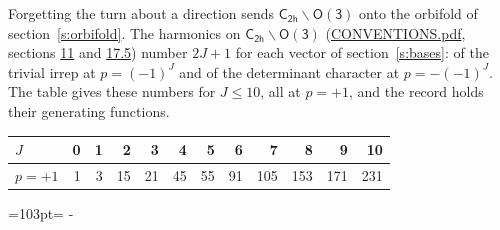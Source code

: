 \documentclass[10pt,a4paper]{article}
\newcommand{\needspace}[1]{\par\penalty-100\begingroup\dimen0=#1\relax\dimen2=\pagegoal
  \advance\dimen2-\pagetotal\ifdim\dimen0>\dimen2\relax\ifdim\dimen2>0pt\vfil\break\fi\fi
  \endgroup}
\numberwithin{equation}{section}
\newcommand{\grp}[1]{\mathsf{#1}}
\begin{document}
Forgetting the turn about a direction sends $\grp{C_{2h}}\backslash\grp{O(3)}$ onto the orbifold of section~\ref{s:orbifold}.
The harmonics on $\grp{C_{2h}}\backslash\grp{O(3)}$ (\href{../../CONVENTIONS.pdf}{CONVENTIONS.pdf}, sections \href{../../CONVENTIONS.pdf\#conv.11}{11} and \href{../../CONVENTIONS.pdf\#conv.17.5}{17.5}) number $2J + 1$ for each vector of section~\ref{s:bases}: of the trivial irrep at $p = (-1)^J$ and of the determinant character at $p = -(-1)^J$. The table gives these numbers for $J \le 10$, all at $p = +1$, and the record holds their generating functions.
{\small\setlength{\tabcolsep}{4pt}\begin{longtable}{@{}lrrrrrrrrrrr@{}}\toprule
$J$ & 0 & 1 & 2 & 3 & 4 & 5 & 6 & 7 & 8 & 9 & 10\\\midrule\endhead
\bottomrule\endfoot\endlastfoot
$p = +1$ & 1 & 3 & 15 & 21 & 45 & 55 & 91 & 105 & 153 & 171 & 231\\
\bottomrule\end{longtable}}
\needspace{103pt}
\end{document}
